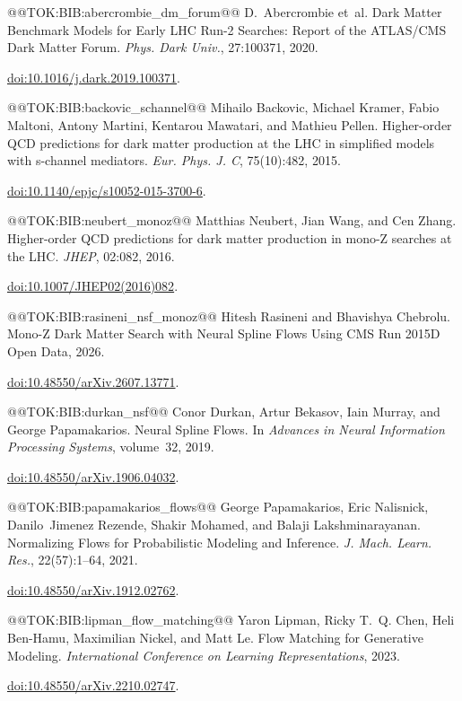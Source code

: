 \documentclass{article}
\begin{document}
@@TOK:BIB:abercrombie_dm_forum@@ D.~Abercrombie et~al.
  {Dark Matter Benchmark Models for Early LHC Run-2 Searches: Report of
  the ATLAS/CMS Dark Matter Forum}.
  {\em Phys. Dark Univ.}, 27:100371, 2020.
 
  \href{https://doi.org/10.1016/j.dark.2019.100371}{doi:10.1016/j.dark.2019.100371}.

@@TOK:BIB:backovic_schannel@@ Mihailo Backovic, Michael Kramer, Fabio Maltoni, Antony Martini, Kentarou
  Mawatari, and Mathieu Pellen.
  {Higher-order QCD predictions for dark matter production at the LHC
  in simplified models with s-channel mediators}.
  {\em Eur. Phys. J. C}, 75(10):482, 2015.
 
  \href{https://doi.org/10.1140/epjc/s10052-015-3700-6}{doi:10.1140/epjc/s10052-015-3700-6}.

@@TOK:BIB:neubert_monoz@@ Matthias Neubert, Jian Wang, and Cen Zhang.
  {Higher-order QCD predictions for dark matter production in mono-Z
  searches at the LHC}.
  {\em JHEP}, 02:082, 2016.
 
  \href{https://doi.org/10.1007/JHEP02(2016)082}{doi:10.1007/JHEP02(2016)082}.

@@TOK:BIB:rasineni_nsf_monoz@@ Hitesh Rasineni and Bhavishya Chebrolu.
  {Mono-Z Dark Matter Search with Neural Spline Flows Using CMS Run
  2015D Open Data}, 2026.
 
  \href{https://doi.org/10.48550/arXiv.2607.13771}{doi:10.48550/arXiv.2607.13771}.

@@TOK:BIB:durkan_nsf@@ Conor Durkan, Artur Bekasov, Iain Murray, and George Papamakarios.
  {Neural Spline Flows}.
  In {\em Advances in Neural Information Processing Systems},
  volume~32, 2019.
 
  \href{https://doi.org/10.48550/arXiv.1906.04032}{doi:10.48550/arXiv.1906.04032}.

@@TOK:BIB:papamakarios_flows@@ George Papamakarios, Eric Nalisnick, Danilo~Jimenez Rezende, Shakir Mohamed,
  and Balaji Lakshminarayanan.
  {Normalizing Flows for Probabilistic Modeling and Inference}.
  {\em J. Mach. Learn. Res.}, 22(57):1--64, 2021.
 
  \href{https://doi.org/10.48550/arXiv.1912.02762}{doi:10.48550/arXiv.1912.02762}.

@@TOK:BIB:lipman_flow_matching@@ Yaron Lipman, Ricky T.~Q. Chen, Heli Ben-Hamu, Maximilian Nickel, and Matt Le.
  {Flow Matching for Generative Modeling}.
  {\em International Conference on Learning Representations}, 2023.
 
  \href{https://doi.org/10.48550/arXiv.2210.02747}{doi:10.48550/arXiv.2210.02747}.
\end{document}
